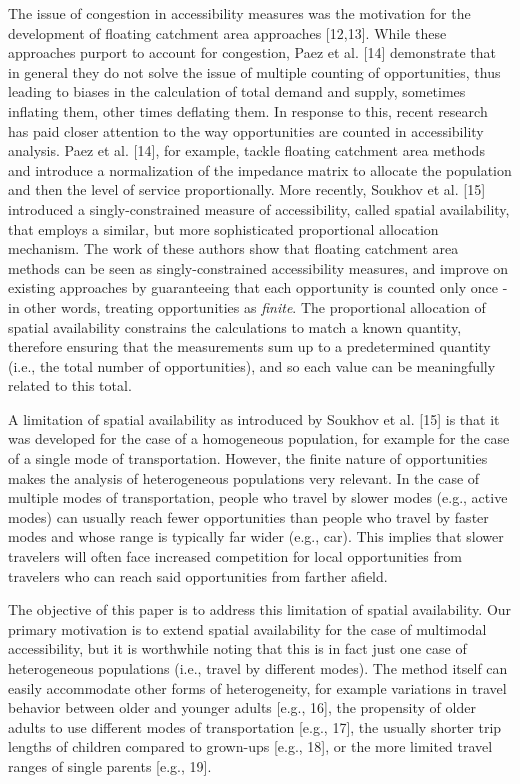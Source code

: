 \documentclass[10pt,letterpaper]{article}
\begin{document}
The issue of congestion in accessibility measures was the motivation for
the development of floating catchment area approaches {[}12,13{]}. While
these approaches purport to account for congestion, Paez et al. {[}14{]}
demonstrate that in general they do not solve the issue of multiple
counting of opportunities, thus leading to biases in the calculation of
total demand and supply, sometimes inflating them, other times deflating
them. In response to this, recent research has paid closer attention to
the way opportunities are counted in accessibility analysis. Paez et al.
{[}14{]}, for example, tackle floating catchment area methods and
introduce a normalization of the impedance matrix to allocate the
population and then the level of service proportionally. More recently,
Soukhov et al. {[}15{]} introduced a singly-constrained measure of
accessibility, called spatial availability, that employs a similar, but
more sophisticated proportional allocation mechanism. The work of these
authors show that floating catchment area methods can be seen as
singly-constrained accessibility measures, and improve on existing
approaches by guaranteeing that each opportunity is counted only once -
in other words, treating opportunities as \emph{finite}. The
proportional allocation of spatial availability constrains the
calculations to match a known quantity, therefore ensuring that the
measurements sum up to a predetermined quantity (i.e., the total number
of opportunities), and so each value can be meaningfully related to this
total.

A limitation of spatial availability as introduced by Soukhov et al.
{[}15{]} is that it was developed for the case of a homogeneous
population, for example for the case of a single mode of transportation.
However, the finite nature of opportunities makes the analysis of
heterogeneous populations very relevant. In the case of multiple modes
of transportation, people who travel by slower modes (e.g., active
modes) can usually reach fewer opportunities than people who travel by
faster modes and whose range is typically far wider (e.g., car). This
implies that slower travelers will often face increased competition for
local opportunities from travelers who can reach said opportunities from
farther afield.

The objective of this paper is to address this limitation of spatial
availability. Our primary motivation is to extend spatial availability
for the case of multimodal accessibility, but it is worthwhile noting
that this is in fact just one case of heterogeneous populations (i.e.,
travel by different modes). The method itself can easily accommodate
other forms of heterogeneity, for example variations in travel behavior
between older and younger adults {[}e.g., 16{]}, the propensity of older
adults to use different modes of transportation {[}e.g., 17{]}, the
usually shorter trip lengths of children compared to grown-ups {[}e.g.,
18{]}, or the more limited travel ranges of single parents {[}e.g.,
19{]}.
\end{document}
